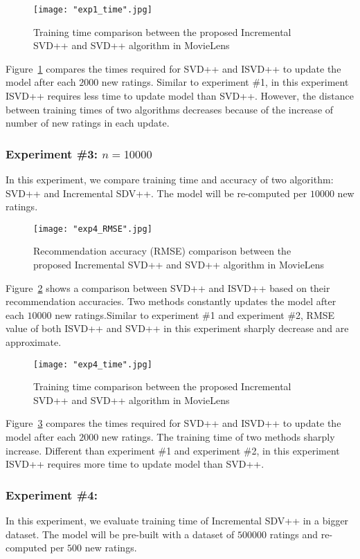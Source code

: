 \documentclass[oneside,13pt]{extreport}
\begin{document}
\clearpage
\begin{figure}[h!]
    \centering
    \texttt{[image: "exp1\_time".jpg]} 
    \caption{ Training time comparison between the proposed Incremental SVD++ and SVD++ algorithm in MovieLens}
    \label{fig:exp1_time}
\end{figure}
Figure~\ref{fig:exp1_time} compares the times required for SVD++ and ISVD++ to update the model after each $2000$ new ratings. Similar to experiment \#1, in this experiment ISVD++ requires less time to update model than SVD++. However, the distance between training times of two algorithms decreases because of the increase of number of new ratings in each update.  

\clearpage
\subsubsection{Experiment \#3: $n=10000$}
In this experiment, we compare training time and accuracy of two algorithm: SVD++ and Incremental SDV++. The model will be re-computed per $10000$ new ratings.

\begin{figure}[h!]
    \centering
    \texttt{[image: "exp4\_RMSE".jpg]} 
    \caption{ Recommendation accuracy (RMSE) comparison between the proposed Incremental SVD++ and SVD++ algorithm in MovieLens}
    \label{fig:exp4_RMSE}
\end{figure}
Figure~\ref{fig:exp4_RMSE} shows a comparison between SVD++ and ISVD++ based on their recommendation accuracies. Two methods constantly updates the model after each $10000$ new ratings.Similar to experiment \#1 and  experiment \#2, RMSE value of both ISVD++ and SVD++ in this  experiment sharply decrease and are approximate.
\clearpage
\begin{figure}[h!]
    \centering
    \texttt{[image: "exp4\_time".jpg]} 
    \caption{ Training time comparison between the proposed Incremental SVD++ and SVD++ algorithm in MovieLens}
    \label{fig:exp4_time}
\end{figure}
Figure~\ref{fig:exp4_time} compares the times required for SVD++ and ISVD++ to update the model after each $2000$ new ratings. The training time of two methods sharply increase. Different than experiment \#1 and experiment \#2, in this experiment ISVD++ requires more time to update model than SVD++. 

\subsubsection{Experiment \#4:}
In this experiment, we evaluate training time of Incremental SDV++ in a bigger dataset. The model will be pre-built with a dataset of $500000$ ratings and re-computed per $500$ new ratings.
\end{document}
